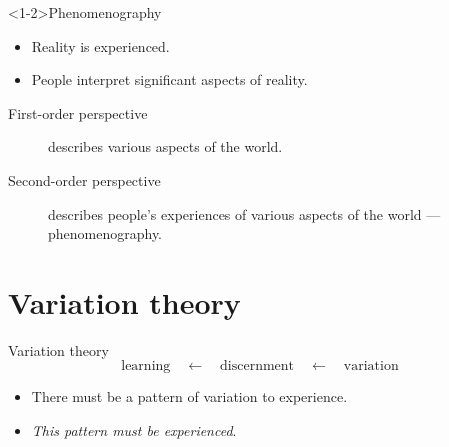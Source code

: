 \begin{frame}
  \begin{block}<1-2>{Phenomenography~\cite{Phenomenography}}
    \begin{itemize}
      \item Reality is experienced.
      \item People interpret significant aspects of reality.
    \end{itemize}
    \pause
    \begin{description}
      \item[First-order perspective] describes various aspects of the world.
      \item[Second-order perspective] describes people's experiences of various 
        aspects of the world --- phenomenography.
    \end{description}
  \end{block}
\end{frame}

\section{Variation theory}

\begin{frame}
  \begin{block}{Variation theory~\cite{VariationTheory}}
    \vspace{-0.5em}
    \[
      \text{learning}
      \quad\leftarrow\quad
      \text{discernment}
      \quad\leftarrow\quad
      \text{variation}
    \]
  \end{block}

  \pause

  \begin{remark}
    \begin{itemize}
      \item There must be a pattern of variation to experience.
      \item \emph{This pattern must be experienced}.
    \end{itemize}
  \end{remark}
\end{frame}

